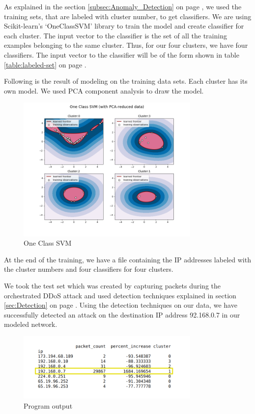 \documentclass[12pt,oneside,a4paper]{article}
\begin{document}
As explained in the section \ref{subsec:Anomaly_Detection} on page \pageref{subsec:Anomaly_Detection}, we used the training sets, that are labeled with cluster number, to get classifiers. We are using Scikit-learn's `OneClassSVM' library to train the model and create classifier for each cluster. The input vector to the classifier is the set of all the training examples belonging to the same cluster. Thus, for our four clusters, we have four classifiers. The input vector to the classifier will be of the form shown in table \ref{table:labeled-set} on page \pageref{table:labeled-set}.

Following is the result of modeling on the training data sets. Each cluster has its own model. We used PCA component analysis to draw the model.

\begin{figure}[H]
\centering
\includegraphics[width=0.80\textwidth]{one-class-SVM.png}
\caption{One Class SVM} \label{fig:one-class-SVM}
\end{figure}

At the end of the training, we have a file containing the IP addresses labeled with the cluster numbers and four classifiers for four clusters.

We took the test set which was created by capturing packets during the orchestrated DDoS attack and used detection techniques explained in section \ref{sec:Detection} on page \pageref{sec:Detection}. Using the detection techniques on our data, we have successfully detected an attack on the destination IP address 92.168.0.7 in our modeled network.

\begin{figure}[H]
\centering
\includegraphics[width=0.80\textwidth]{detected_IP.png}
\caption{Program output} \label{fig:detected_IP}
\end{figure}
\pagebreak
\end{document}
